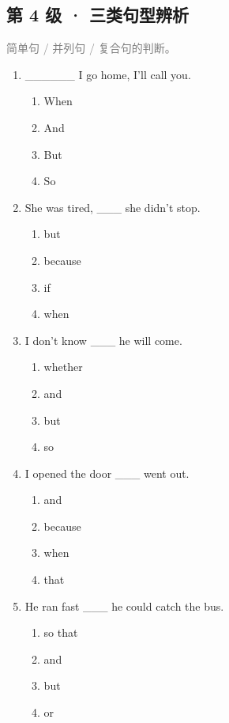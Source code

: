 \documentclass[11pt,a4paper]{ctexart}
\begin{document}
\subsection*{第 4 级 · 三类句型辨析}
\noindent\textcolor{gray}{简单句 / 并列句 / 复合句的判断。}\par\smallskip
\begin{enumerate}[leftmargin=*,itemsep=4pt]
\item \_\_\_\_\_\_ I go home, I’ll call you.
\begin{enumerate}[label=\Alph*.,leftmargin=2em,itemsep=1pt,topsep=2pt]
\item When
\item And
\item But
\item So
\end{enumerate}
\item She was tired, \_\_\_ she didn’t stop.
\begin{enumerate}[label=\Alph*.,leftmargin=2em,itemsep=1pt,topsep=2pt]
\item but
\item because
\item if
\item when
\end{enumerate}
\item I don’t know \_\_\_ he will come.
\begin{enumerate}[label=\Alph*.,leftmargin=2em,itemsep=1pt,topsep=2pt]
\item whether
\item and
\item but
\item so
\end{enumerate}
\item I opened the door \_\_\_ went out.
\begin{enumerate}[label=\Alph*.,leftmargin=2em,itemsep=1pt,topsep=2pt]
\item and
\item because
\item when
\item that
\end{enumerate}
\item He ran fast \_\_\_ he could catch the bus.
\begin{enumerate}[label=\Alph*.,leftmargin=2em,itemsep=1pt,topsep=2pt]
\item so that
\item and
\item but
\item or

\end{enumerate}
\end{enumerate}
\end{document}
